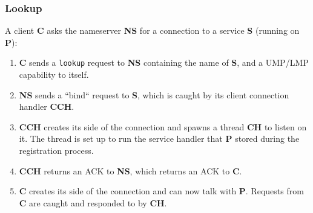 \subsubsection{Lookup}
A client \textbf{C} asks the nameserver \textbf{NS} for a connection to a service \textbf{S} (running on \textbf{P}):
\begin{enumerate}[itemsep=0pt]
    \item \textbf{C} sends a \texttt{lookup} request to \textbf{NS} containing the name of \textbf{S}, and a UMP/LMP capability to itself.
    \item \textbf{NS} sends a ``bind`` request to \textbf{S}, which is caught by its client connection handler \textbf{CCH}.
    \item \textbf{CCH} creates its side of the connection and spawns a thread \textbf{CH} to listen on it. The thread is set up to run the service handler that \textbf{P} stored during the registration process.
    \item \textbf{CCH} returns an ACK to \textbf{NS}, which returns an ACK to \textbf{C}.
    \item \textbf{C} creates its side of the connection and can now talk with \textbf{P}. Requests from \textbf{C} are caught and responded to by \textbf{CH}. 
\end{enumerate}

